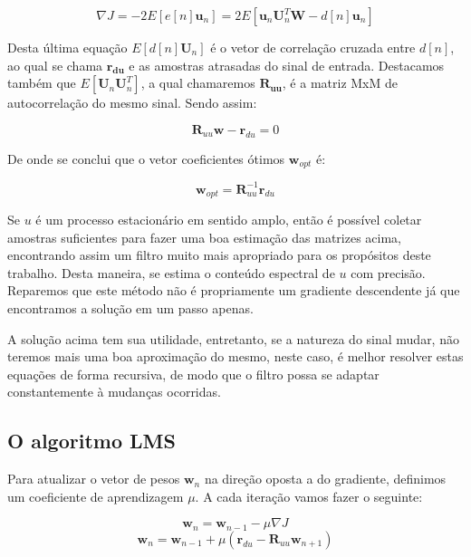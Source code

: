 \begin{equation}
\nabla J=-2 E[e[n]\boldsymbol{u}_n]=2E[\boldsymbol{u}_n\boldsymbol{U}^{T}_n\boldsymbol{W}-d[n]\boldsymbol{u}_n]   
\end{equation}

Desta última equação $E[d[n]\boldsymbol{U}_n]$ é o vetor de correlação cruzada entre $d[n]$, ao qual se chama $\boldsymbol{r_{du}}$ e as amostras atrasadas do sinal de entrada. Destacamos também que $E[\boldsymbol{U}_n\boldsymbol{U}^{T}_n]$, a qual chamaremos $\boldsymbol{R_{uu}}$, é a matriz MxM de autocorrelação do mesmo sinal. Sendo assim:

\begin{equation}
\boldsymbol{R}_{uu}\boldsymbol{w}-\boldsymbol{r}_{du}=0
\end{equation}

De onde se conclui que o vetor coeficientes ótimos $\boldsymbol{w}_{opt}$ é:

\begin{equation}
\boldsymbol{w}_{opt}=\boldsymbol{R}_{uu}^{-1}\boldsymbol{r}_{du}
\end{equation}

Se $u$ é um processo estacionário em sentido amplo, então é possível coletar amostras suficientes para fazer uma boa estimação das matrizes acima, encontrando assim um filtro muito mais apropriado para os propósitos deste trabalho. Desta maneira, se estima o conteúdo espectral de $u$ com precisão. Reparemos que este método não é propriamente um gradiente descendente já que encontramos a solução em um passo apenas.

\indent A solução acima tem sua utilidade, entretanto, se a natureza do sinal mudar, não teremos mais uma boa aproximação do mesmo, neste caso, é melhor resolver estas equações de forma recursiva, de modo que o filtro possa se adaptar constantemente à mudanças ocorridas.  

\subsection{O algoritmo LMS}

Para atualizar o vetor de pesos $\boldsymbol{w}_n$ na direção oposta a do gradiente, definimos um coeficiente de aprendizagem $\mu$. A cada iteração vamos fazer o seguinte:

\begin{equation*}
\boldsymbol{w}_{n}=\boldsymbol{w}_{n-1} - \mu \nabla J
\end{equation*}
\begin{equation}
\boldsymbol{w}_{n}=\boldsymbol{w}_{n-1} + \mu(\boldsymbol{r}_{du}-\boldsymbol{R}_{uu} \boldsymbol{w}_{n+1})
\label{eq:w_lms}
\end{equation}

